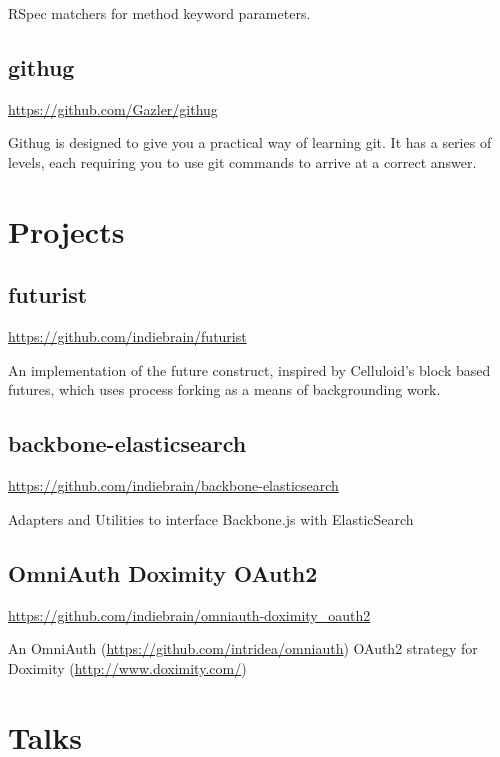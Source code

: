 \documentclass[12pt letterpaper notitlepage]{article}
\begin{document}
RSpec matchers for method keyword parameters.

\subsection*{githug}
\label{sec:orgc3cc92a}

\url{https://github.com/Gazler/githug}

Githug is designed to give you a practical way of learning git. It has a series of levels, each requiring you to use git commands to arrive at a correct answer.

\section*{Projects}
\label{sec:org254a000}

\subsection*{futurist}
\label{sec:orgbb0abbe}

\url{https://github.com/indiebrain/futurist}

An implementation of the future construct, inspired by Celluloid's block based futures, which uses process forking as a means of backgrounding work.

\subsection*{backbone-elasticsearch}
\label{sec:orga070d24}

\url{https://github.com/indiebrain/backbone-elasticsearch}

Adapters and Utilities to interface Backbone.js with ElasticSearch

\subsection*{OmniAuth Doximity OAuth2}
\label{sec:orgef74723}

\url{https://github.com/indiebrain/omniauth-doximity\_oauth2}

An OmniAuth (\url{https://github.com/intridea/omniauth}) OAuth2 strategy for
Doximity (\url{http://www.doximity.com/})

\section*{Talks}
\label{sec:org8599081}
\end{document}
